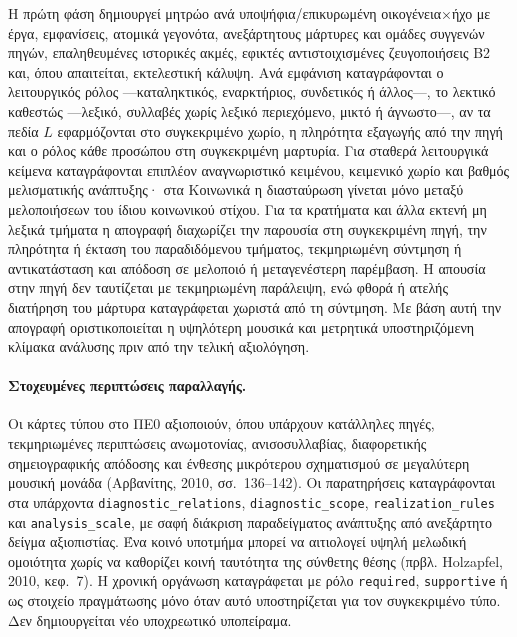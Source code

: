 \documentclass[11pt,a4paper]{article}
\begin{document}
Η πρώτη φάση δημιουργεί μητρώο ανά υποψήφια/επικυρωμένη οικογένεια×ήχο με έργα, εμφανίσεις, ατομικά γεγονότα, ανεξάρτητους μάρτυρες και ομάδες συγγενών πηγών, επαληθευμένες ιστορικές ακμές, εφικτές αντιστοιχισμένες ζευγοποιήσεις B2 και, όπου απαιτείται, εκτελεστική κάλυψη. Ανά εμφάνιση καταγράφονται ο λειτουργικός ρόλος ---καταληκτικός, εναρκτήριος, συνδετικός ή άλλος---, το λεκτικό καθεστώς ---λεξικό, συλλαβές χωρίς λεξικό περιεχόμενο, μικτό ή άγνωστο---, αν τα πεδία $L$ εφαρμόζονται στο συγκεκριμένο χωρίο, η πληρότητα εξαγωγής από την πηγή και ο ρόλος κάθε προσώπου στη συγκεκριμένη μαρτυρία. Για σταθερά λειτουργικά κείμενα καταγράφονται επιπλέον αναγνωριστικό κειμένου, κειμενικό χωρίο και βαθμός μελισματικής ανάπτυξης· στα Κοινωνικά η διασταύρωση γίνεται μόνο μεταξύ μελοποιήσεων του ίδιου κοινωνικού στίχου. Για τα κρατήματα και άλλα εκτενή μη λεξικά τμήματα η απογραφή διαχωρίζει την παρουσία στη συγκεκριμένη πηγή, την πληρότητα ή έκταση του παραδιδόμενου τμήματος, τεκμηριωμένη σύντμηση ή αντικατάσταση και απόδοση σε μελοποιό ή μεταγενέστερη παρέμβαση. Η απουσία στην πηγή δεν ταυτίζεται με τεκμηριωμένη παράλειψη, ενώ φθορά ή ατελής διατήρηση του μάρτυρα καταγράφεται χωριστά από τη σύντμηση. Με βάση αυτή την απογραφή οριστικοποιείται η υψηλότερη μουσικά και μετρητικά υποστηριζόμενη κλίμακα ανάλυσης πριν από την τελική αξιολόγηση.

\paragraph{Στοχευμένες περιπτώσεις παραλλαγής.} Οι κάρτες τύπου στο ΠΕ0 αξιοποιούν, όπου υπάρχουν κατάλληλες πηγές, τεκμηριωμένες περιπτώσεις ανωμοτονίας, ανισοσυλλαβίας, διαφορετικής σημειογραφικής απόδοσης και ένθεσης μικρότερου σχηματισμού σε μεγαλύτερη μουσική μονάδα (Αρβανίτης, 2010, σσ.~136--142). Οι παρατηρήσεις καταγράφονται στα υπάρχοντα \texttt{diagnostic\_relations}, \texttt{diagnostic\_scope}, \texttt{realization\_rules} και \texttt{analysis\_scale}, με σαφή διάκριση παραδείγματος ανάπτυξης από ανεξάρτητο δείγμα αξιοπιστίας. Ένα κοινό υποτμήμα μπορεί να αιτιολογεί υψηλή μελωδική ομοιότητα χωρίς να καθορίζει κοινή ταυτότητα της σύνθετης θέσης (πρβλ. Holzapfel, 2010, κεφ.~7). Η χρονική οργάνωση καταγράφεται με ρόλο \texttt{required}, \texttt{supportive} ή ως στοιχείο πραγμάτωσης μόνο όταν αυτό υποστηρίζεται για τον συγκεκριμένο τύπο. Δεν δημιουργείται νέο υποχρεωτικό υποπείραμα.
\end{document}

